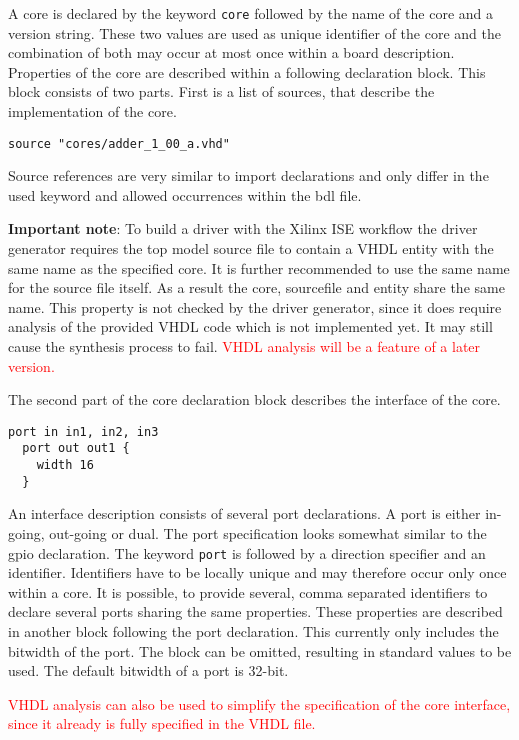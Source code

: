\documentclass{report}
\begin{document}
A core is declared by the keyword \texttt{core} followed by the name of the core and a version string. These two values are used as unique identifier of the core and the combination of both may occur at most once within a board description. Properties of the core are described within a following declaration block. This block consists of two parts. First is a list of sources, that describe the implementation of the core.

\begin{lstlisting}[language=bdl]
  source "cores/adder_1_00_a.vhd"
\end{lstlisting}

Source references are very similar to import declarations and only differ in the used keyword and allowed occurrences within the bdl file.

\textbf{Important note}: To build a driver with the Xilinx ISE workflow the driver generator requires the top model source file to contain a VHDL entity with the same name as the specified core. It is further recommended to use the same name for the source file itself. As a result the core, sourcefile and entity share the same name. This property is not checked by the driver generator, since it does require analysis of the provided VHDL code which is not implemented yet. It may still cause the synthesis process to fail. \textcolor{red}{VHDL analysis will be a feature of a later version.}

The second part of the core declaration block describes the interface of the core.

\begin{lstlisting}[language=bdl]
  port in in1, in2, in3
  port out out1 {
    width 16
  }
\end{lstlisting}

An interface description consists of several port declarations. A port is either in-going, out-going or dual. The port specification looks somewhat similar to the gpio declaration. The keyword \texttt{port} is followed by a direction specifier and an identifier. Identifiers have to be locally unique and may therefore occur only once within a core. It is possible, to provide several, comma separated identifiers to declare several ports sharing the same properties. These properties are described in another block following the port declaration. This currently only includes the bitwidth of the port. The block can be omitted, resulting in standard values to be used. The default bitwidth of a port is 32-bit.

\textcolor{red}{VHDL analysis can also be used to simplify the specification of the core interface, since it already is fully specified in the VHDL file.}
\end{document}

